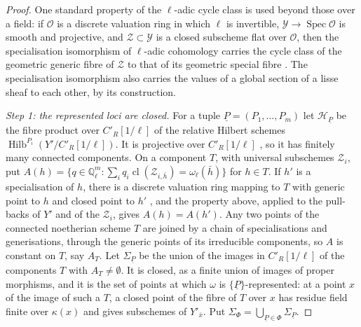 \documentclass[11pt,reqno]{amsart}
\theoremstyle{plain}
\theoremstyle{definition}
\theoremstyle{remark}
\newcommand{\QQ}{\mathbb{Q}}
\newcommand{\cH}{\mathcal{H}}
\DeclareMathOperator{\Hilb}{Hilb}
\DeclareMathOperator{\Spec}{Spec}
\begin{document}
\begin{proof}
One standard property of the $\ell$-adic cycle class is used beyond those over
a field: if $\mathcal{O}$ is a discrete valuation ring in which $\ell$ is
invertible, $\mathcal{Y}\to\Spec\mathcal{O}$ is smooth and projective, and
$\mathcal{Z}\subset\mathcal{Y}$ is a closed subscheme flat over $\mathcal{O}$,
then the specialisation isomorphism of $\ell$-adic cohomology carries the
cycle class of the geometric generic fibre of $\mathcal{Z}$ to that of its
geometric special fibre \cite[Cycle]{SGA4h}. The specialisation isomorphism
also carries the values of a global section of a lisse sheaf to each other,
by its construction.

\emph{Step 1: the represented loci are closed.} For a tuple
$\underline{P}=(P_{1},\dots,P_{m})$ let $\cH_{\underline{P}}$ be the fibre
product over $C'_{R}[1/\ell]$ of the relative Hilbert schemes
$\Hilb^{P_{i}}(Y'/C'_{R}[1/\ell])$. It is projective over $C'_{R}[1/\ell]$
\cite{Gro61}, so it has finitely many connected components. On a component
$T$, with universal subschemes $\mathcal{Z}_{i}$, put $A(h)=\{q\in
\QQ_{\ell}^{m}:\sum_{i}q_{i}\operatorname{cl}(\mathcal{Z}_{i,\bar{h}})
=\omega_{\ell}(\bar{h})\}$ for $h\in T$. If $h'$ is a specialisation of $h$,
there is a discrete valuation ring mapping to $T$ with generic point to $h$ and
closed point to $h'$ \cite[Tag~054F]{Stacks}, and the property above, applied
to the pull-backs of $Y'$ and of the $\mathcal{Z}_{i}$, gives $A(h)=A(h')$.
Any two points of the connected noetherian scheme $T$ are joined by a chain of
specialisations and generisations, through the generic points of its
irreducible components, so $A$ is constant on $T$, say $A_{T}$. Let
$\Sigma_{\underline{P}}$ be the union of the images in $C'_{R}[1/\ell]$ of the
components $T$ with $A_{T}\ne\emptyset$. It is closed, as a finite union of
images of proper morphisms, and it is the set of points at which $\omega$ is
$\{\underline{P}\}$-represented: at a point $x$ of the image of such a $T$, a
closed point of the fibre of $T$ over $x$ has residue field finite over
$\kappa(x)$ and gives subschemes of $Y'_{\bar{x}}$. Put
$\Sigma_{\Phi}=\bigcup_{\underline{P}\in\Phi}\Sigma_{\underline{P}}$.


\end{proof}
\end{document}
